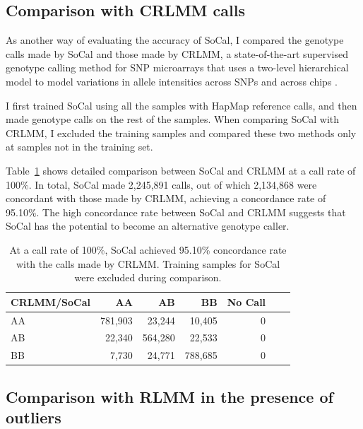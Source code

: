 \documentclass{scrartcl}
\begin{document}
\subsection{Comparison with CRLMM calls}

\par
As another way of evaluating the accuracy of SoCal, I compared the genotype
calls made by SoCal and those made by CRLMM, a state-of-the-art
supervised genotype calling method for SNP microarrays that uses a two-level
hierarchical model to model variations in allele intensities
across SNPs and across chips \cite{carvalho2007}.

\par
I first trained SoCal using all the samples with HapMap reference calls, and
then made genotype calls on the rest of the samples.
When comparing SoCal with CRLMM, I excluded the training samples and compared
these two methods only at samples not in the training set.

\par
Table~\ref{table:cmp_socal_crlmm} shows detailed comparison between SoCal
and CRLMM at a call rate of 100\%.
In total, SoCal made 2,245,891 calls, out of which 2,134,868 were concordant
with those made by CRLMM, achieving a concordance rate of 95.10\%.
The high concordance rate between SoCal and CRLMM suggests that SoCal has the
potential to become an alternative genotype caller.

\begin{table}[H]
\centering
\begin{tabular}{l*{5}{r}r}
    \hline
    CRLMM/SoCal   & AA       & AB      & BB      & No Call \\ \hline
    AA            & 781,903  & 23,244  & 10,405  & 0  \\
    AB            & 22,340   & 564,280 & 22,533  & 0  \\
    BB            & 7,730    & 24,771  & 788,685 & 0  \\ \hline
\end{tabular}
\caption{At a call rate of 100\%, SoCal achieved 95.10\% concordance rate
with the calls made by CRLMM. Training samples for SoCal were excluded during
comparison.}
\label{table:cmp_socal_crlmm}
\end{table}

\subsection{Comparison with RLMM in the presence of outliers}
\end{document}
